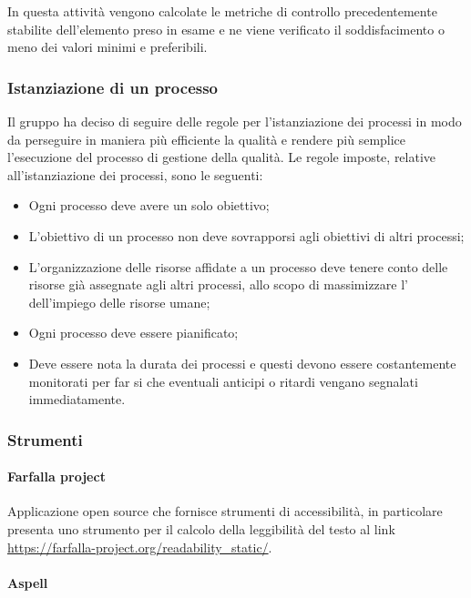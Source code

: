 In questa attività vengono calcolate le metriche di controllo precedentemente stabilite dell'elemento preso in esame e ne viene verificato 
il soddisfacimento o meno dei valori minimi e preferibili.

\subsubsection{Istanziazione di un processo}
Il gruppo ha deciso di seguire delle regole per l'istanziazione dei processi in modo da perseguire in maniera più 
efficiente la qualità e rendere più semplice l'esecuzione del processo di gestione della qualità. Le regole imposte, 
relative all'istanziazione dei processi, sono le seguenti:
\begin{itemize}
    \item Ogni processo deve avere un solo obiettivo;
    \item L'obiettivo di un processo non deve sovrapporsi agli obiettivi di altri processi;
    \item L'organizzazione delle risorse affidate a un processo deve tenere conto delle risorse già assegnate agli 
    altri processi, allo scopo di massimizzare l' dell'impiego delle risorse umane;
    \item Ogni processo deve essere pianificato;
    \item Deve essere nota la durata dei processi e questi devono essere costantemente monitorati per far si che 
    eventuali anticipi o ritardi vengano segnalati immediatamente.
\end{itemize}

\subsubsection{Strumenti}
\label{ssub:gestione_qualita:strumenti}

\paragraph{Farfalla project}
\label{par:farfalla_project}

Applicazione open source che fornisce strumenti di accessibilità, in particolare presenta uno strumento per il calcolo della leggibilità 
del testo al link \url{https://farfalla-project.org/readability_static/}.

\paragraph{Aspell}
\label{par:aspell}

